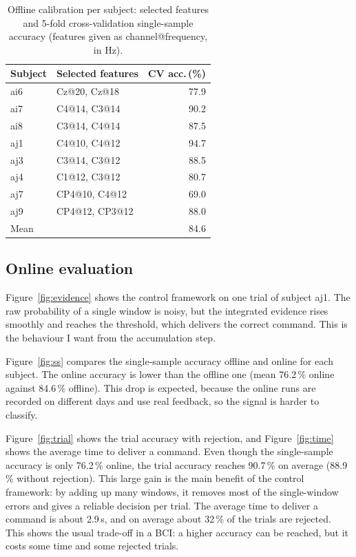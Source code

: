 \documentclass[10pt,twocolumn,a4paper]{article}
\begin{document}
\begin{table}[h]
\centering
\caption{Offline calibration per subject: selected features and 5-fold
cross-validation single-sample accuracy (features given as channel@frequency,
in Hz).}
\label{tab:calib}
\small
\begin{tabular}{@{}llr@{}}
\toprule
Subject & Selected features & CV acc.\,(\%) \\
\midrule
ai6 & Cz@20, Cz@18   & 77.9 \\
ai7 & C4@14, C3@14   & 90.2 \\
ai8 & C3@14, C4@14   & 87.5 \\
aj1 & C4@10, C4@12   & 94.7 \\
aj3 & C3@14, C3@12   & 88.5 \\
aj4 & C1@12, C3@12   & 80.7 \\
aj7 & CP4@10, C4@12  & 69.0 \\
aj9 & CP4@12, CP3@12 & 88.0 \\
\midrule
Mean &              & 84.6 \\
\bottomrule
\end{tabular}
\end{table}

\subsection{Online evaluation}
\label{sec:res-eval}

Figure~\ref{fig:evidence} shows the control framework on one trial of subject
aj1. The raw probability of a single window is noisy, but the integrated evidence
rises smoothly and reaches the threshold, which delivers the correct command.
This is the behaviour I want from the accumulation step.

Figure~\ref{fig:ss} compares the single-sample accuracy offline and online for
each subject. The online accuracy is lower than the offline one (mean
76.2\,\% online against 84.6\,\% offline). This drop is expected, because the
online runs are recorded on different days and use real feedback, so the signal
is harder to classify.

Figure~\ref{fig:trial} shows the trial accuracy with rejection, and
Figure~\ref{fig:time} shows the average time to deliver a command. Even though the
single-sample accuracy is only 76.2\,\% online, the trial accuracy reaches
90.7\,\% on average (88.9\,\% without rejection). This large gain is the main
benefit of the control framework: by adding up many windows, it removes most of
the single-window errors and gives a reliable decision per trial. The average
time to deliver a command is about 2.9\,s, and on average about 32\,\% of the
trials are rejected. This shows the usual trade-off in a BCI: a higher accuracy
can be reached, but it costs some time and some rejected trials.
\end{document}

